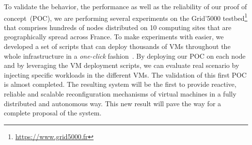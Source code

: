 %
To validate the behavior, the performance as well as the reliability of our
proof of concept~(POC), we are performing several experiments on the Grid'5000 testbed\footnote{\url{https://www.grid5000.fr}}
that comprises hundreds of nodes distributed on 10 computing sites that are geographically spread across France. 
To make experiments with \discovery easier, we developed a set of scripts that can deploy thousands of VMs throughout 
the whole infrastructure in a \emph{one-click} fashion~\cite{flauncher}.  
By deploying our POC on each node and by
leveraging the VM deployment scripts, we can evaluate real scenario by injecting specific workloads in the different VMs. 
The validation of this first POC is almost completed. 
The resulting system will be the first to provide reactive,
reliable and scalable
reconfiguration mechanisms of virtual machines in a fully distributed and
autonomous way. This new result will pave the way for a complete proposal of
the \discovery system. 
